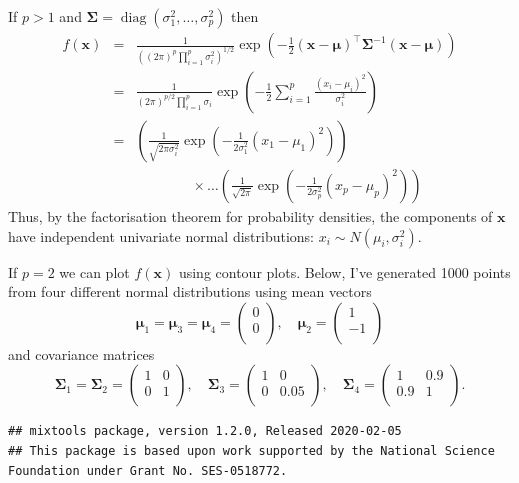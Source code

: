 \documentclass[]{book}
\theoremstyle{definition}
\theoremstyle{definition}
\theoremstyle{definition}
\theoremstyle{remark}
\begin{document}
If \(p>1\) and \(\boldsymbol{\Sigma}= \operatorname{diag}(\sigma_1^2, \ldots, \sigma_p^2)\) then
\begin{eqnarray*}
f(\mathbf x) &=& \frac{1}{((2 \pi)^{p}\prod_{i=1}^p \sigma_i^2)^{1/2}} \exp \left(-\frac{1}{2}(\mathbf x- {\boldsymbol{\mu}})^\top \boldsymbol{\Sigma}^{-1}(\mathbf x- {\boldsymbol{\mu}}) \right)\\
&=& \frac{1}{(2 \pi)^{p/2}\prod_{i=1}^p \sigma_i} \exp \left(-\frac{1}{2} \sum_{i=1}^p \frac{(x_i - \mu_i)^2}{\sigma_i^2} \right)\\
&=& \left(\frac{1}{\sqrt{2 \pi\sigma_i^2}} \exp \left(-\frac{1}{2\sigma_1^2} (x_1 - \mu_1)^2 \right)\right)\\
 && \qquad \qquad \times \ldots \left(\frac{1}{\sqrt{2 \pi}} \exp \left(-\frac{1}{2\sigma_p^2} (x_p - \mu_p)^2 \right)\right)
\end{eqnarray*}
Thus, by the factorisation theorem for probability densities, the components of \(\mathbf x\) have independent univariate normal distributions: \(x_i \sim N(\mu_i, \sigma_i^2)\).

If \(p=2\) we can plot \(f(\mathbf x)\) using contour plots. Below, I've generated 1000 points from four different normal distributions using mean vectors
\[{\boldsymbol{\mu}}_1={\boldsymbol{\mu}}_3={\boldsymbol{\mu}}_4=\begin{pmatrix}0 \\0 \\\end{pmatrix}, \quad {\boldsymbol{\mu}}_2=\begin{pmatrix}1 \\-1 \\\end{pmatrix}\]
and covariance matrices
\[\boldsymbol{\Sigma}_1=\boldsymbol{\Sigma}_2=\begin{pmatrix}1&0 \\0&1 \\\end{pmatrix}, \quad \boldsymbol{\Sigma}_3=\begin{pmatrix}1&0 \\0&0.05 \\\end{pmatrix}, \quad \boldsymbol{\Sigma}_4=\begin{pmatrix}1&0.9 \\0.9&1 \\\end{pmatrix}.\]

\begin{verbatim}
## mixtools package, version 1.2.0, Released 2020-02-05
## This package is based upon work supported by the National Science Foundation under Grant No. SES-0518772.
\end{verbatim}
\end{document}

